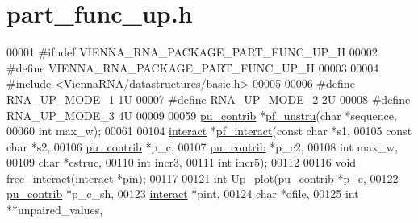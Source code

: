 \hypertarget{part__func__up_8h_source}{}\section{part\+\_\+func\+\_\+up.\+h}
\label{part__func__up_8h_source}

\begin{DoxyCode}
00001 \textcolor{preprocessor}{#ifndef VIENNA\_RNA\_PACKAGE\_PART\_FUNC\_UP\_H}
00002 \textcolor{preprocessor}{#define VIENNA\_RNA\_PACKAGE\_PART\_FUNC\_UP\_H}
00003 
00004 \textcolor{preprocessor}{#include <\hyperlink{datastructures_2basic_8h}{ViennaRNA/datastructures/basic.h}>}
00005 
00006 \textcolor{preprocessor}{#define   RNA\_UP\_MODE\_1   1U}
00007 \textcolor{preprocessor}{#define   RNA\_UP\_MODE\_2   2U}
00008 \textcolor{preprocessor}{#define   RNA\_UP\_MODE\_3   4U}
00009 
00059 \hyperlink{group__data__structures_structpu__contrib}{pu\_contrib} *\hyperlink{group__up__cofold_ga5b4ee40e190d2f633cd01cf0d2fe93cf}{pf\_unstru}(\textcolor{keywordtype}{char} *sequence,
00060                       \textcolor{keywordtype}{int} max\_w);
00061 
00104 \hyperlink{group__data__structures_structinteract}{interact} *\hyperlink{group__up__cofold_ga1aa0aa02bc3a724f87360c03097afd00}{pf\_interact}(\textcolor{keyword}{const} \textcolor{keywordtype}{char} *s1,
00105                       \textcolor{keyword}{const} \textcolor{keywordtype}{char} *s2,
00106                       \hyperlink{group__data__structures_structpu__contrib}{pu\_contrib} *p\_c,
00107                       \hyperlink{group__data__structures_structpu__contrib}{pu\_contrib} *p\_c2,
00108                       \textcolor{keywordtype}{int} max\_w,
00109                       \textcolor{keywordtype}{char} *cstruc,
00110                       \textcolor{keywordtype}{int} incr3,
00111                       \textcolor{keywordtype}{int} incr5);
00112 
00116 \textcolor{keywordtype}{void} \hyperlink{group__up__cofold_gadde308fd5f696dc271b1532aa96fd12f}{free\_interact}(\hyperlink{group__data__structures_structinteract}{interact} *pin);
00117 
00121 \textcolor{keywordtype}{int} Up\_plot(\hyperlink{group__data__structures_structpu__contrib}{pu\_contrib} *p\_c,
00122             \hyperlink{group__data__structures_structpu__contrib}{pu\_contrib} *p\_c\_sh,
00123             \hyperlink{group__data__structures_structinteract}{interact} *pint,
00124             \textcolor{keywordtype}{char} *ofile,
00125             \textcolor{keywordtype}{int} **unpaired\_values,

\end{DoxyCode}
